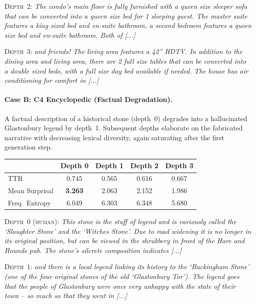 \noindent\textsc{Depth~2:} {\small\itshape The condo's main floor is fully furnished with a queen size sleeper sofa that can be converted into a queen size bed for 1 sleeping guest. The master suite features a king sized bed and en-suite bathroom, a second bedroom features a queen size bed and en-suite bathroom. Both of [...]}
\smallskip

\noindent\textsc{Depth~3:} {\small\itshape and friends! The living area features a 42'' HDTV. In addition to the dining area and living area, there are 2 full size tables that can be converted into a double sized beds, with a full size day bed available if needed. The house has air conditioning for comfort in [...]}

\medskip

\paragraph{Case B: C4 Encyclopedic (Factual Degradation).}
A factual description of a historical stone (depth~0) degrades into a hallucinated Glastonbury legend by depth~1. Subsequent depths elaborate on the fabricated narrative with decreasing lexical diversity, again saturating after the first generation step.

\begin{center}
{\footnotesize
\begin{tabular}{lcccc}
\toprule
& \textbf{Depth 0} & \textbf{Depth 1} & \textbf{Depth 2} & \textbf{Depth 3} \\
\midrule
TTR & 0.745 & 0.565 & 0.616 & 0.667 \\
Mean Surprisal & \textbf{3.263} & 2.063 & 2.152 & 1.986 \\
Freq.\ Entropy & 6.049 & 6.303 & 6.348 & 5.680 \\
\bottomrule
\end{tabular}}
\end{center}

\noindent\textsc{Depth~0 (human):} {\small\itshape This stone is the stuff of legend and is variously called the `Slaughter Stone' and the `Witches Stone'. Due to road widening it is no longer in its original position, but can be viewed in the shrubbery in front of the Hare and Hounds pub. The stone's silcrete composition indicates [...]}
\smallskip

\noindent\textsc{Depth~1:} {\small\itshape and there is a local legend linking its history to the `Buckingham Stone' (one of the four original stones of the old `Glastonbury Tor'). The legend goes that the people of Glastonbury were once very unhappy with the state of their town -- so much so that they went in [...]}
\smallskip

